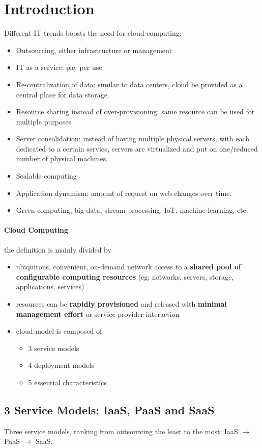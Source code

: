 \section{Introduction}
Different IT-trends boosts the need for cloud computing:
\begin{itemize}
	\item Outsourcing, either infrastructure or management
	\item IT as a service: pay per use
	\item Re-centralization of data: similar to data centers, cloud be provided as a central place for data storage.
	\item Resource sharing instead of over-provisioning: same resource can be used for multiple purposes
	\item Server consolidation: instead of having multiple physical servers, with each dedicated to a certain service, servers are virtualized and put on one/reduced number of physical machines.     
	\item Scalable computing
	\item Application dynamism: amount of request on web changes over time.
	\item Green computing, big data, stream processing, IoT, machine learning, etc.
\end{itemize}

\paragraph{Cloud Computing} the definition is mainly divided by
\begin{itemize}
	\item ubiquitous, convenient, on-demand network access to a \textbf{shared pool of configurable computing resources} (eg: networks, servers, storage, applications, services)
	\item resources can be \textbf{rapidly provisioned} and released with \textbf{minimal management effort} or service provider interaction
	\item cloud model is composed of 
	\begin{itemize}		
		\item 3 service models
		\item 4 deployment models
		\item 5 essential characteristics
	\end{itemize}
\end{itemize}

\subsection{3 Service Models: IaaS, PaaS and SaaS}
Three service models, ranking from outsourcing the least to the most: IaaS $\rightarrow$ PaaS $\rightarrow$ SaaS.

